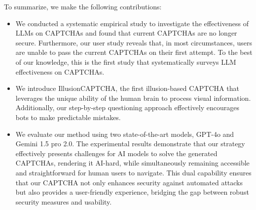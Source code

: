 To summarize, we make the following contributions: 
\begin{itemize}[leftmargin=*]
    \setlength\itemsep{0pt}
    \item We conducted a systematic empirical study to investigate the effectiveness of LLMs on CAPTCHAs and found that current CAPTCHAs are no longer secure. Furthermore, our user study reveals that, in most circumstances, users are unable to pass the current CAPTCHAs on their first attempt. To the best of our knowledge, this is the first study that systematically surveys LLM effectiveness on CAPTCHAs.
    
    \item We introduce IllusionCAPTCHA, the first illusion-based CAPTCHA that leverages the unique ability of the human brain to process visual information. Additionally, our step-by-step questioning approach effectively encourages bots to make predictable mistakes.
    
    \item We evaluate our method using two state-of-the-art models, GPT-4o and Gemini 1.5 pro 2.0. The experimental results demonstrate that our strategy effectively presents challenges for AI models to solve the generated CAPTCHAs, rendering it AI-hard, while simultaneously remaining accessible and straightforward for human users to navigate. This dual capability ensures that our CAPTCHA not only enhances security against automated attacks but also provides a user-friendly experience, bridging the gap between robust security measures and usability.
\end{itemize}












